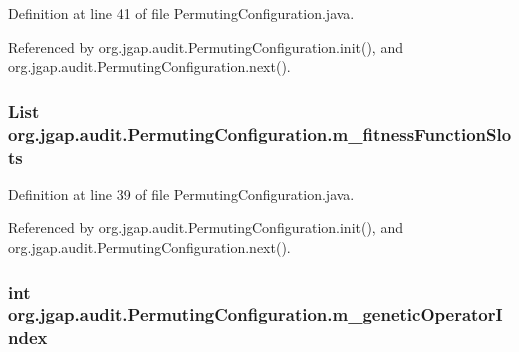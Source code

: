 Definition at line 41 of file Permuting\-Configuration.\-java.



Referenced by org.\-jgap.\-audit.\-Permuting\-Configuration.\-init(), and org.\-jgap.\-audit.\-Permuting\-Configuration.\-next().

\hypertarget{classorg_1_1jgap_1_1audit_1_1_permuting_configuration_afa0d7029208eb38eed5d952fa2ddc360}{
\subsubsection[{m\-\_\-fitness\-Function\-Slots}]{\setlength{\rightskip}{0pt plus 5cm}List org.\-jgap.\-audit.\-Permuting\-Configuration.\-m\-\_\-fitness\-Function\-Slots\hspace{0.3cm}{\ttfamily [private]}}}\label{classorg_1_1jgap_1_1audit_1_1_permuting_configuration_afa0d7029208eb38eed5d952fa2ddc360}


Definition at line 39 of file Permuting\-Configuration.\-java.



Referenced by org.\-jgap.\-audit.\-Permuting\-Configuration.\-init(), and org.\-jgap.\-audit.\-Permuting\-Configuration.\-next().

\hypertarget{classorg_1_1jgap_1_1audit_1_1_permuting_configuration_ac2d9386cc2e49d33b8dcd315c3cd4788}{
\subsubsection[{m\-\_\-genetic\-Operator\-Index}]{\setlength{\rightskip}{0pt plus 5cm}int org.\-jgap.\-audit.\-Permuting\-Configuration.\-m\-\_\-genetic\-Operator\-Index\hspace{0.3cm}{\ttfamily [private]}}}\label{classorg_1_1jgap_1_1audit_1_1_permuting_configuration_ac2d9386cc2e49d33b8dcd315c3cd4788}


